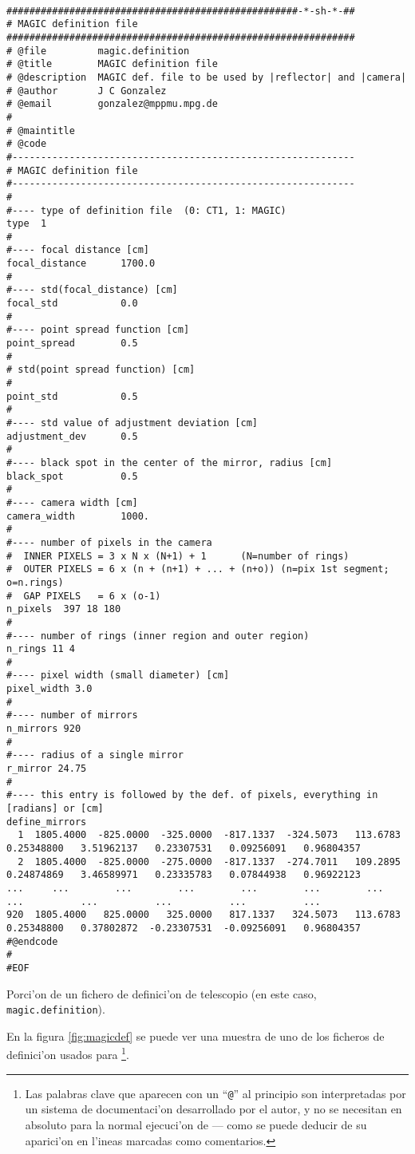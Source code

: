 \begin{listado}
  \tiny
\begin{verbatim}

###################################################-*-sh-*-##
# MAGIC definition file
#############################################################
# @file         magic.definition
# @title        MAGIC definition file
# @description  MAGIC def. file to be used by |reflector| and |camera|
# @author       J C Gonzalez
# @email        gonzalez@mppmu.mpg.de
#
# @maintitle
# @code
#------------------------------------------------------------ 
# MAGIC definition file
#------------------------------------------------------------
#
#---- type of definition file  (0: CT1, 1: MAGIC)
type  1
#
#---- focal distance [cm]
focal_distance      1700.0
#
#---- std(focal_distance) [cm]
focal_std           0.0
#
#---- point spread function [cm]
point_spread        0.5
#
# std(point spread function) [cm]
#
point_std           0.5
#
#---- std value of adjustment deviation [cm]
adjustment_dev      0.5
#
#---- black spot in the center of the mirror, radius [cm]
black_spot          0.5
#
#---- camera width [cm]
camera_width        1000.
#
#---- number of pixels in the camera 
#  INNER PIXELS = 3 x N x (N+1) + 1      (N=number of rings)
#  OUTER PIXELS = 6 x (n + (n+1) + ... + (n+o)) (n=pix 1st segment; o=n.rings)
#  GAP PIXELS   = 6 x (o-1)
n_pixels  397 18 180 
#
#---- number of rings (inner region and outer region)
n_rings 11 4 
#
#---- pixel width (small diameter) [cm] 
pixel_width 3.0
#
#---- number of mirrors
n_mirrors 920
#
#---- radius of a single mirror
r_mirror 24.75
#
#---- this entry is followed by the def. of pixels, everything in [radians] or [cm]
define_mirrors
  1  1805.4000  -825.0000  -325.0000  -817.1337  -324.5073   113.6783   0.25348800   3.51962137   0.23307531   0.09256091   0.96804357
  2  1805.4000  -825.0000  -275.0000  -817.1337  -274.7011   109.2895   0.24874869   3.46589971   0.23335783   0.07844938   0.96922123
...     ...        ...        ...        ...        ...        ...        ...          ...          ...          ...          ...
920  1805.4000   825.0000   325.0000   817.1337   324.5073   113.6783   0.25348800   0.37802872  -0.23307531  -0.09256091   0.96804357
#@endcode
#
#EOF
\end{verbatim}
  \caption{Porci'on de un fichero de definici'on de telescopio (en este caso, 
    \texttt{magic.definition}).}
  \label{fig:magicdef}
\end{listado}

En la figura \ref{fig:magicdef} se puede ver una muestra de uno de los
ficheros de definici'on usados para \MAGIC\footnote{Las palabras clave
  que aparecen con un ``\texttt{@}'' al principio son interpretadas
  por un sistema de documentaci'on desarrollado por el autor, y no se
  necesitan en absoluto para la normal ejecuci'on de  ---
  como se puede deducir de su aparici'on en l'ineas marcadas como
  comentarios.}.

